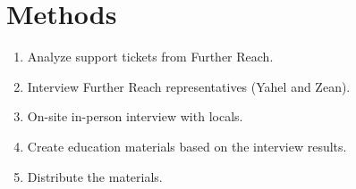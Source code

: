 \section{Methods}
\label{sec:methods}

\begin{enumerate}
\item Analyze support tickets from Further Reach.
\item Interview Further Reach representatives (Yahel and Zean).
\item On-site in-person interview with locals.
\item Create education materials based on the interview results.
\item Distribute the materials.
\end{enumerate}


